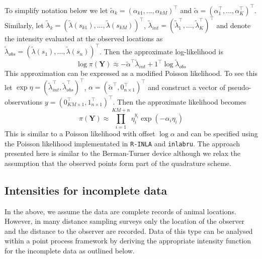 \documentclass[preprint,12pt]{elsarticle}
\newcommand{\bm}{\boldsymbol}  %
\newcommand{\tl}{\tilde{\lambda}}   %
\begin{document}
To simplify notation below we let $\tilde{\alpha}_{k} = (\alpha_{k1}, \ldots, \alpha_{kM})^\intercal$ and $\tilde{\alpha} = (\alpha_1^\intercal, \ldots, \alpha_K^\intercal)^\intercal$.  Similarly, let $\tl_k = (\tl(s_{k1}), \ldots, \tl(s_{kM}))^\intercal$, $\tl_{int} = (\tl_1^\intercal, \ldots, \tl_K^\intercal)^\intercal$ and denote the intensity evaluated at the observed locations as $\tl_{obs} = (\tl(s_1), \ldots, \tl(s_n))^\intercal$.  Then the approximate log-likelihood is
\begin{equation}
\label{approx-log-likelihood}
	\log \pi(\bm{Y}) \approx - \tilde{\alpha}^\intercal \tl_{int} + 1^\intercal\log\tl_{obs}
\end{equation}
This approximation can be expressed as a modified Poisson likelihood.  To see this let $\exp \eta = (\tl_{int}^\intercal, \tl_{obs}^\intercal)^\intercal$,
$\alpha = (\tilde{\alpha}^\intercal, 0_{n \times 1}^\intercal)^\intercal$ and construct a vector of pseudo-observations $y = (0_{KM\times 1}^\intercal, 1_{n \times 1}^\intercal)^\intercal$.  Then the approximate likelihood becomes
\begin{equation}
\pi(\bm{Y}) \approx \prod_{i=1}^{KM + n} \eta_i^{y_i}\exp(-\alpha_i\eta_i)
\end{equation}
This is similar to a Poisson likelihood with offset $\log\alpha$ and can be specified using the Poisson likelihood implementated in \texttt{R-INLA} and \texttt{inlabru}.  The approach presented here is similar to the Berman-Turner device \citep{berman_approximating_1992, baddeley_practical_2000} although we relax the assumption that the observed points form part of the quadrature scheme.

\subsection{Intensities for incomplete data}

In the above, we assume the data are complete records of animal locations.  However, in many distance sampling surveys only the location of the observer and the distance to the observer are recorded.  Data of this type can be analysed within a point process framework by deriving the appropriate intensity function for the incomplete data as outlined below.
\end{document}
